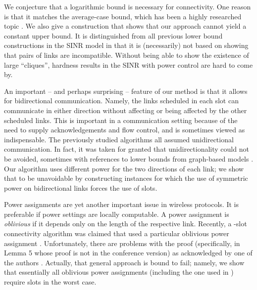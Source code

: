 \documentclass[11pt]{amsart}
\begin{document}
We conjecture that a logarithmic bound is necessary for connectivity.
One reason is that it matches the average-case bound, which has been a
highly researched topic \cite{Kumar00}.
We also give a construction that shows that our approach cannot yield a constant upper bound.
It is distinguished from all previous lower bound constructions in the SINR model in that it is (necessarily) not based on showing that pairs of links are incompatible. Without being able to show the existence of large ``cliques'', hardness results in the SINR with power control are hard to come by.


An important -- and perhaps surprising -- feature of our method is that it allows for bidirectional
communication. Namely, the links scheduled in each slot can
communicate in either direction without affecting or being affected by 
the other scheduled links.
This is important in a communication
setting because of the need to supply acknowledgements and flow
control, and is sometimes viewed as indispensable.
The previously studied algorithms 
\cite{MoWa06,moscibroda06b,Moscibroda07} all assumed unidirectional
communication. In fact, it was taken for granted that
unidirectionality could not be avoided, sometimes with references to 
lower bounds from graph-based models \cite{moscibroda06b}. Our algorithm uses
different power for the two directions of each link; we show that
to be unavoidable by constructing instances for which 
the use of symmetric power on bidirectional links 
forces the use of  slots.

\iffalse
Another issue with structure design is simplicity and naturalness.
Previous algorithms mix all three tasks in the same loops: deciding on structure (i.e.,
choosing the links), scheduling the links, and assigning
powers to senders. We start with the perhaps the most natural and best
studied of structures, the minimum spanning tree (or, a local
approximation thereof). We have a simple rule for selecting links for
each slot, and finish by assigning powers with a single sequential
pass through the links in each slot. 
\fi

Power assignments are yet another important issue in wireless protocols.
It is preferable if power settings are locally computable.
A power assignment is \emph{oblivious} if it depends only on the
length of the respective link.
Recently, a -slot connectivity
algorithm was claimed that used a particular oblivious power
assignment \cite{DBLP:conf/wdag/KowalskiR10}.
Unfortunately, there are problems with the proof (specifically, in Lemma 5 whose proof is not in the conference version) as acknowledged by one of the authors \cite{Kowalski11}. 
Actually, that general approach is bound to fail;
namely, we show that essentially all oblivious power
assignments (including the one used in \cite{DBLP:conf/wdag/KowalskiR10})
require  slots in the worst case.
\end{document}
